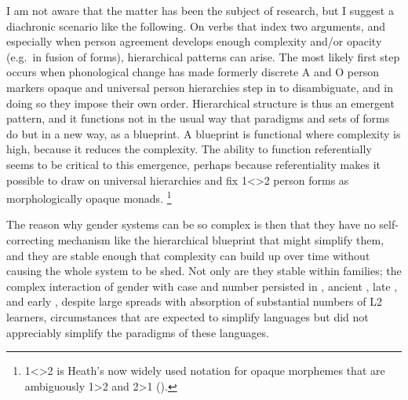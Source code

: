 \documentclass[output=collectionpaper]{langsci/langscibook}
\begin{document}
I am not aware that the matter has been the subject of research, but I suggest a diachronic scenario like the following. On verbs that index two arguments, and especially when person agreement develops enough complexity and/or opacity (e.g.\ in fusion of forms), hierarchical patterns can arise. The most likely first step occurs when phonological change has made formerly discrete A and O person markers opaque and universal person hierarchies step in to disambiguate, and in doing so they impose their own order. Hierarchical structure is thus an emergent pattern, and it functions not in the usual way that paradigms and sets of forms do but in a new way, as a blueprint. A blueprint is functional where complexity is high, because it reduces the complexity. The ability to function referentially seems to be critical to this emergence, perhaps because referentiality makes it possible to draw on universal hierarchies and fix 1<>2 person forms as morphologically opaque monads.%
\footnote{%
1<>2 is Heath's now widely used notation for opaque morphemes that are ambiguously 1>2 and 2>1 (\citeyear{Heath1998}).
}%

The reason why gender systems can be so complex is then that they have no self-correcting mechanism like the hierarchical blueprint that might simplify them, and they are stable enough that complexity can build up over time without causing the whole system to be shed. Not only are they stable within families; the complex interaction of gender with case and number persisted in , ancient , late , and early , despite large spreads with absorption of substantial numbers of L2 learners, circumstances that are expected to simplify languages but did not appreciably simplify the paradigms of these languages.
\end{document}
